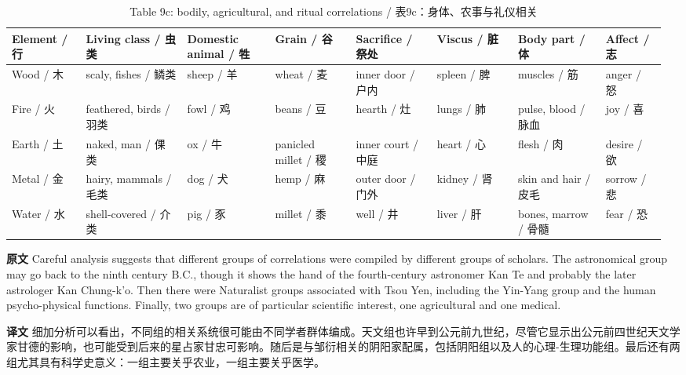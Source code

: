 \documentclass[UTF8,zihao=-4]{ctexart}
\newcommand{\BodyFont}{\fontsize{10.5pt}{15.5pt}\selectfont}
\newcommand{\origlabel}{\textbf{原文}\quad}
\newcommand{\translabel}{\textbf{译文}\quad}
\newenvironment{enblock}{\par\noindent\begingroup\BodyFont\origlabel}{\par\endgroup}
\newenvironment{zhblock}{\par\noindent\begingroup\BodyFont\translabel}{\par\endgroup\vspace{0.35em}}
\begin{document}
\begin{longtable}{>{\raggedright\arraybackslash}p{0.11\linewidth}
                  >{\raggedright\arraybackslash}p{0.15\linewidth}
                  >{\raggedright\arraybackslash}p{0.13\linewidth}
                  >{\raggedright\arraybackslash}p{0.12\linewidth}
                  >{\raggedright\arraybackslash}p{0.12\linewidth}
                  >{\raggedright\arraybackslash}p{0.12\linewidth}
                  >{\raggedright\arraybackslash}p{0.13\linewidth}
                  >{\raggedright\arraybackslash}p{0.09\linewidth}}
\caption{Table 9c: bodily, agricultural, and ritual correlations / 表9c：身体、农事与礼仪相关}\\
\toprule
Element / 行 & Living class / 虫类 & Domestic animal / 牲 & Grain / 谷 & Sacrifice / 祭处 & Viscus / 脏 & Body part / 体 & Affect / 志\\
\midrule
Wood / 木 & scaly, fishes / 鳞类 & sheep / 羊 & wheat / 麦 & inner door / 户内 & spleen / 脾 & muscles / 筋 & anger / 怒\\
Fire / 火 & feathered, birds / 羽类 & fowl / 鸡 & beans / 豆 & hearth / 灶 & lungs / 肺 & pulse, blood / 脉血 & joy / 喜\\
Earth / 土 & naked, man / 倮类 & ox / 牛 & panicled millet / 稷 & inner court / 中庭 & heart / 心 & flesh / 肉 & desire / 欲\\
Metal / 金 & hairy, mammals / 毛类 & dog / 犬 & hemp / 麻 & outer door / 门外 & kidney / 肾 & skin and hair / 皮毛 & sorrow / 悲\\
Water / 水 & shell-covered / 介类 & pig / 豕 & millet / 黍 & well / 井 & liver / 肝 & bones, marrow / 骨髓 & fear / 恐\\
\bottomrule
\end{longtable}

\begin{enblock}
Careful analysis suggests that different groups of correlations were compiled by different groups of scholars. The astronomical group may go back to the ninth century B.C., though it shows the hand of the fourth-century astronomer Kan Te and probably the later astrologer Kan Chung-k'o. Then there were Naturalist groups associated with Tsou Yen, including the Yin-Yang group and the human psycho-physical functions. Finally, two groups are of particular scientific interest, one agricultural and one medical.
\end{enblock}
\begin{zhblock}
细加分析可以看出，不同组的相关系统很可能由不同学者群体编成。天文组也许早到公元前九世纪，尽管它显示出公元前四世纪天文学家甘德的影响，也可能受到后来的星占家甘忠可影响。随后是与邹衍相关的阴阳家配属，包括阴阳组以及人的心理-生理功能组。最后还有两组尤其具有科学史意义：一组主要关乎农业，一组主要关乎医学。
\end{zhblock}
\end{document}

